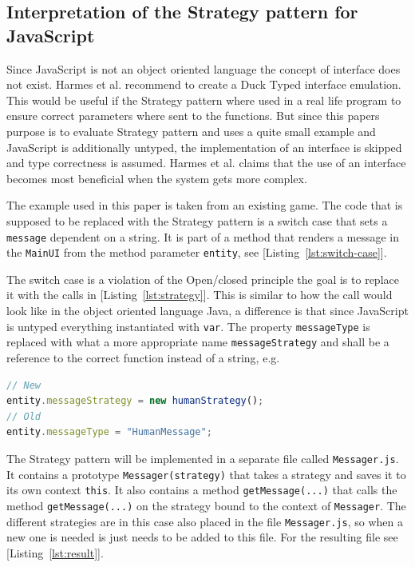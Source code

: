 \documentclass[conference, a4paper]{IEEEtran}
\begin{document}
\subsection{Interpretation of the Strategy pattern for JavaScript}
\label{sec:JavaScript}
Since JavaScript is not an object oriented language the concept of interface does not exist. Harmes et al. recommend to create a Duck Typed interface emulation. This would be useful if the Strategy pattern where used in a real life program to ensure correct parameters where sent to the functions. But since this papers purpose is to evaluate Strategy pattern and uses a quite small example and JavaScript is additionally untyped, the implementation of an interface is skipped and type correctness is assumed. Harmes et al. claims that the use of an interface becomes most beneficial when the system gets more complex.~\cite{bibitem:DiazHarmes}

The example used in this paper is taken from an existing game. The code that is supposed to be replaced with the Strategy pattern is a switch case that sets a \texttt{message} dependent on a string. It is part of a method that renders a message in the \texttt{MainUI} from the method parameter \texttt{entity}, see [Listing~\ref{lst:switch-case}].

The switch case is a violation of the Open/closed principle the goal is to replace it with the calls in [Listing~\ref{lst:strategy}]. This is similar to how the call would look like in the object oriented language Java, a difference is that since JavaScript is untyped everything instantiated with \texttt{var}. The property \texttt{messageType} is replaced with what a more appropriate name \texttt{messageStrategy} and shall be a reference to the correct function instead of a string, e.g.

\begin{lstlisting}[language=JavaScript]
// New
entity.messageStrategy = new humanStrategy();
// Old
entity.messageType = "HumanMessage";
\end{lstlisting}

The Strategy pattern will be implemented in a separate file called \texttt{Messager.js}. It contains a prototype \texttt{Messager(strategy)} that takes a strategy and saves it to its own context \texttt{this}. It also contains a method \texttt{getMessage(...)} that calls the method \texttt{getMessage(...)} on the strategy bound to the context of \texttt{Messager}. The different strategies are in this case also placed in the file \texttt{Messager.js}, so when a new one is needed is just needs to be added to this file. For the resulting file see [Listing~\ref{lst:result}].
\end{document}
